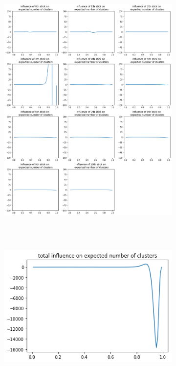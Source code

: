 \documentclass[a4paper]{article}
\begin{document}
\begin{figure}[h!]
	\centering
	\begin{subfigure}[t]{0.6\textwidth}
		\includegraphics[width = \textwidth]{./functional_sensitivity_figs/influence_on_num_clusters.png}
	\end{subfigure}\\
	\quad \\
	\begin{subfigure}[t]{0.5\textwidth}
		\includegraphics[width = \textwidth]{./functional_sensitivity_figs/total_influence_on_num_clusters.png}

\end{subfigure}
\end{figure}
\end{document}
